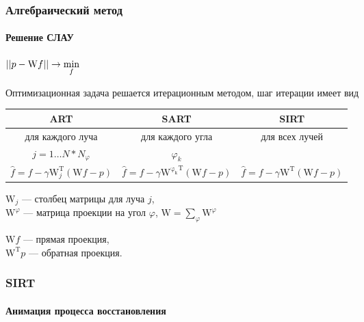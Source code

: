 \begin{frame}
\frametitle{Алгебраический метод}
\framesubtitle{Решение СЛАУ}
\centering
$\left|\left| p - \mathrm W f \right|\right| \rightarrow \min\limits_f$

Оптимизационная задача решается итерационным методом, шаг итерации имеет вид
\vspace{0.5cm}

\begingroup
\footnotesize

\hspace*{-0.5cm}
\begin{tabular}{c|c|c}
ART & SART & SIRT \\ \hline
для каждого луча & для каждого угла & для всех лучей\\
$j = 1 \dots N * N_\varphi$ & $\varphi_k$ & \\
$\hat{f} = f - \gamma \mathrm W^{\mathrm T}_j(\mathrm W f - p)$ &
$\hat{f} = f - \gamma \mathrm {W^{\varphi_k}}^{\mathrm T}(\mathrm W f - p)$ &
$\hat{f} = f - \gamma \mathrm W^{\mathrm T}(\mathrm W f - p)$ \\
\end{tabular}

\vspace{0.2cm}
\raggedright
\endgroup

$\mathrm W_j$ --- столбец матрицы для луча $j$,\\
$\mathrm W^\varphi$ ---  матрица проекции на угол $\varphi$, $\mathrm W = \sum_\varphi {\mathrm W^\varphi}$
\\
\vspace{0.4cm}

$\mathrm W f$ --- прямая проекция, \\
$\mathrm W^{\mathrm T} p$ --- обратная проекция.
\end{frame}


\begin{frame}
\frametitle{SIRT}
\framesubtitle{Анимация процесса восстановления}
\begin{columns}[T,onlytextwidth]
\begin{column}{0.4\textwidth}
\end{column}

\begin{column}{0.6\textwidth}
\end{column}
\end{columns}
\end{frame}

